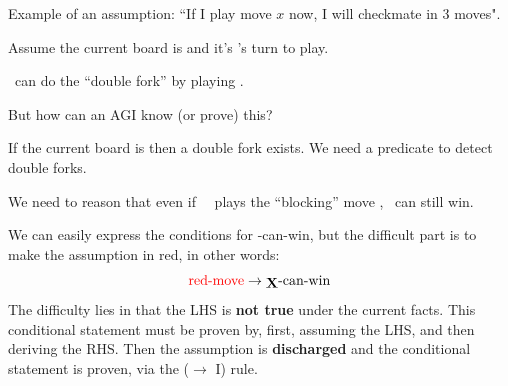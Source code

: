 Example of an assumption:  ``If I play move $x$ now, I will checkmate in 3 moves".

\begin{tcolorbox}[breakable, parbox=false, fonttitle=\bfseries, title=Tic Tac Toe example]
	
	Assume the current board is
	 and it's \Xb's turn to play.
	
	\Xb \ can do the ``double fork'' by playing
	.
	
	But how can an AGI know (or prove) this?
	
	If the current board is 
	  then a double fork exists.  We need a predicate to detect double forks.
	
	We need to reason that even if \ \bO \ plays the ``blocking'' move
	  , \Xb \ can still win.
	
	We can easily express the conditions for \Xb-can-win, but the difficult part is to make the assumption in {\color{red}red}, in other words:
	\begin{equation}
	\mbox{{\color{red}red-move}} \rightarrow \mbox{\Xb-can-win}
	\end{equation}
	The difficulty lies in that the LHS is \textbf{not true} under the current facts.  This conditional statement must be proven by, first, assuming the LHS, and then deriving the RHS.  Then the assumption is \textbf{discharged} and the conditional statement is proven, via the ($\rightarrow$ I) rule.
	
\end{tcolorbox}

